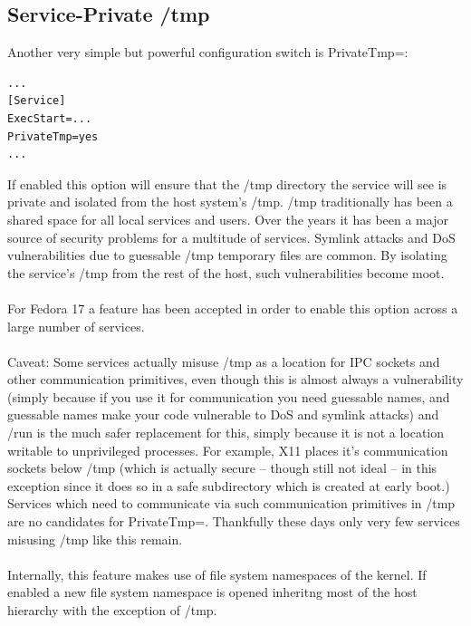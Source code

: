 \documentclass[titlepage]{article}
\begin{document}
\subsection{Service-Private /tmp}
Another very simple but powerful configuration switch is PrivateTmp=:
\begin{lstlisting}
...
[Service]
ExecStart=...
PrivateTmp=yes
...
\end{lstlisting}
If enabled this option will ensure that the /tmp directory the service will see is private and isolated from the host system's /tmp. /tmp traditionally has been a shared space for all local services and users. Over the years it has been a major source of security problems for a multitude of services. Symlink attacks and DoS vulnerabilities due to guessable /tmp temporary files are common. By isolating the service's /tmp from the rest of the host, such vulnerabilities become moot.
\\
\\
For Fedora 17 a feature has been accepted in order to enable this option across a large number of services.
\\
\\
Caveat: Some services actually misuse /tmp as a location for IPC sockets and other communication primitives, even though this is almost always a vulnerability (simply because if you use it for communication you need guessable names, and guessable names make your code vulnerable to DoS and symlink attacks) and /run is the much safer replacement for this, simply because it is not a location writable to unprivileged processes. For example, X11 places it's communication sockets below /tmp (which is actually secure -- though still not ideal -- in this exception since it does so in a safe subdirectory which is created at early boot.) Services which need to communicate via such communication primitives in /tmp are no candidates for PrivateTmp=. Thankfully these days only very few services misusing /tmp like this remain.
\\
\\
Internally, this feature makes use of file system namespaces of the kernel. If enabled a new file system namespace is opened inheritng most of the host hierarchy with the exception of /tmp.
\end{document}
